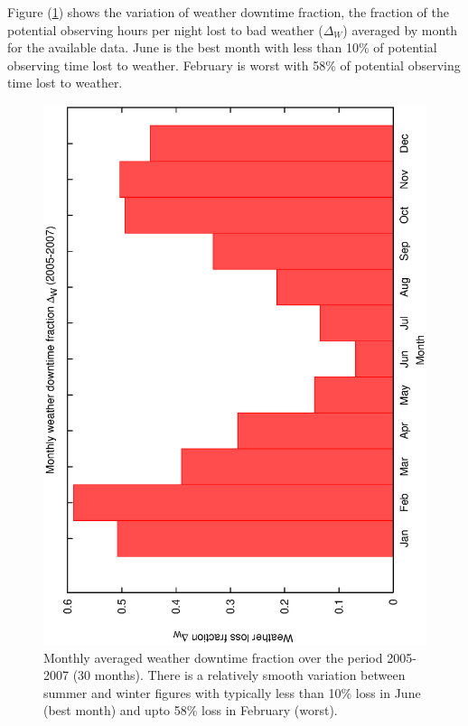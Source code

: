 {{Figure (\ref{fig:ecs_monthly_weather_stats}) shows the variation of weather downtime fraction, the fraction of the potential observing hours per night lost to bad weather ($\Delta_W$) averaged by month for the available data. June is the best month with less than 10\% of potential observing time lost to weather. February is worst with 58\% of potential observing time lost to weather.


\begin{figure}[htbp]
\begin{center}
    \includegraphics[scale=0.4, angle=-90]{figures/ecs/monthly_weather_stats.eps}
\end{center}   
\caption[Monthly averaged weather downtime fraction.]
{Monthly averaged weather downtime fraction over the period 2005-2007 (30 months). There is a relatively smooth variation between summer and winter figures with typically less than 10\% loss in June (best month) and upto 58\% loss in February (worst).}
 \label{fig:ecs_monthly_weather_stats}
\end{figure}


}}
